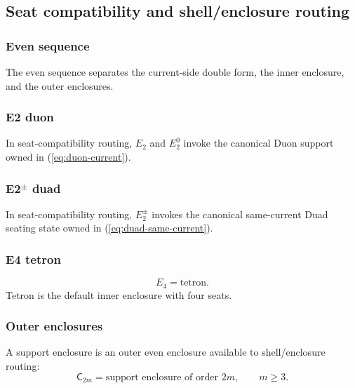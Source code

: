 
\subsection{Seat compatibility and shell/enclosure routing}\label{sec:seat-shell-enclosure-routing}

\subsubsection{Even sequence}\label{subsec:support-enclosure-even-sequence}
The even sequence separates the current-side double form, the inner enclosure, and the outer enclosures.

\subsubsection{E2 duon}\label{subsec:e2-duon}
In seat-compatibility routing, \(E_2\) and \(E_2^0\) invoke the canonical Duon
support owned in  (\eqref{eq:duon-current}).

\subsubsection{E2\texorpdfstring{\(^{\pm}\)}{±} duad}\label{subsec:e2-duad}
In seat-compatibility routing, \(E_2^{\pm}\) invokes the canonical same-current
Duad seating state owned in  (\eqref{eq:duad-same-current}).

\subsubsection{E4 tetron}\label{subsec:e4-tetron}
\[
E_4=\mathrm{tetron}.
\]
Tetron is the default inner enclosure with four seats.

\subsubsection{Outer enclosures}\label{subsec:outer-enclosures}
A support enclosure is an outer even enclosure available to shell/enclosure routing:
\[
\mathsf C_{2m}=\text{support enclosure of order }2m,
\qquad m\ge3.
\]

